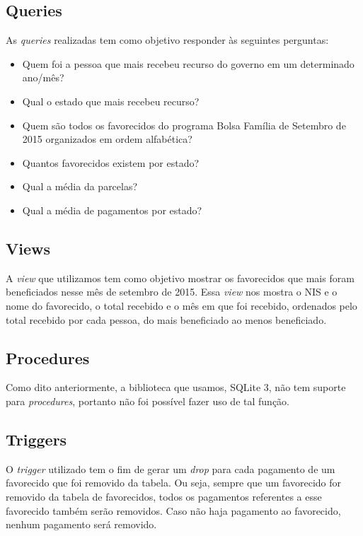 \documentclass[12pt]{article}
\begin{document}
	\subsection{Queries}
	\label{sec:query}
	
	As \emph{queries} realizadas tem como objetivo responder às seguintes perguntas:
	
	\begin{itemize}
		\item Quem foi a pessoa que mais recebeu recurso do governo em um determinado ano/mês?
		\item Qual o estado que mais recebeu recurso?
		\item Quem são todos os favorecidos do programa Bolsa Família de Setembro de 2015 organizados em ordem alfabética?
		\item Quantos favorecidos existem por estado?
		\item Qual a média da parcelas?
		\item Qual a média de pagamentos por estado?
	\end{itemize}
	
	\subsection{Views}
	\label{sec:view}
	
	A \emph{view} que utilizamos tem como objetivo mostrar os favorecidos que mais foram beneficiados nesse mês de setembro de 2015. Essa \emph{view} nos mostra o NIS e o nome do favorecido, o total recebido e o mês em que foi recebido, ordenados pelo total recebido por cada pessoa, do mais beneficiado ao menos beneficiado.
	
	\subsection{Procedures}
	\label{sec:proc}
	
	Como dito anteriormente, a biblioteca que usamos, SQLite 3, não tem suporte para \emph{procedures}, portanto não foi possível fazer uso de tal função.
	
	\subsection{Triggers}
	\label{sec:trig}
	
	O \emph{trigger} utilizado tem o fim de gerar um \emph{drop} para cada pagamento de um favorecido que foi removido da tabela. Ou seja, sempre que um favorecido for removido da tabela de favorecidos, todos os pagamentos referentes a esse favorecido também serão removidos. Caso não haja pagamento ao favorecido, nenhum pagamento será removido.
	
\end{document}
